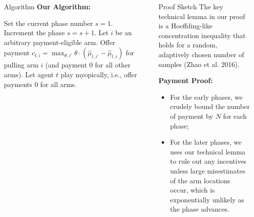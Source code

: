 \documentclass[final]{beamer}
\newlength{\sepwid}
\newlength{\onecolwid}
\begin{document}
\begin{frame}[t]
\begin{columns}[t]
\begin{column}{\onecolwid}
\begin{block}{Algorithm}
\vspace{0.5cm}
\textbf{Our Algorithm:}
\vspace{0.5cm}

\begin{algorithmic}
\STATE Set the current phase number $s = 1$.
 {
\STATE Increment the phase $s = s + 1$.
\ENDIF
{} 
    \STATE Let $i$ be an arbitrary payment-eligible arm.
    \STATE Offer payment $c_{t,i} = \max_{\theta,i'} \theta \cdot (\hat{\mu}_{t,i'} - \hat{\mu}_{t,i})$ for pulling arm $i$ (and payment 0 for all other arms).
\ELSE
    \STATE Let agent $t$ play myopically, i.e., offer payments 0 for all arms.
\ENDIF 
}\ENDFOR
\end{algorithmic}

\end{block}
		
\end{column}

\begin{column}{\sepwid}\end{column} %

\begin{column}{\onecolwid} %


\begin{block}{Proof Sketch}
The key technical lemma in our proof is a Hoeffding-like concentration inequality that holds for a random, adaptively chosen number of samples (Zhao et al. 2016).

\vspace{1cm}

\textbf{Payment Proof:}
\begin{itemize}
\item For the early phases, we crudely bound the number of payment by $N$ for each phase;
\vspace{0.3cm}
\item For the later phases, we uses our technical lemma to rule out any incentives unless large misestimates of the arm locations occur, which is exponentially unlikely as the phase advances.
\end{itemize}

\vspace{1cm}


\end{block}
\end{column}
\end{columns}
\end{frame}
\end{document}
